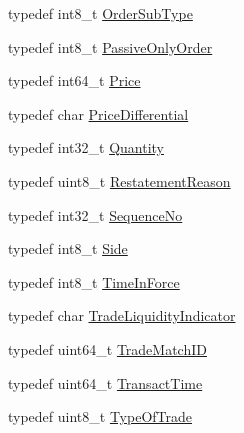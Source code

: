 \begin{DoxyCompactItemize}
\item 
typedef int8\+\_\+t \hyperlink{namespaceMetal_1_1LSE_afd57250a16de7395f5ad2bc63c7b8e5e}{Order\+Sub\+Type}
\item 
typedef int8\+\_\+t \hyperlink{namespaceMetal_1_1LSE_afb7bdec752b9048b6d725e2421586a64}{Passive\+Only\+Order}
\item 
typedef int64\+\_\+t \hyperlink{namespaceMetal_1_1LSE_a4a629b5e2aed21d653db0debf8b63af4}{Price}
\item 
typedef char \hyperlink{namespaceMetal_1_1LSE_a43d1d8f30663383025e28ce3ca39a19c}{Price\+Differential}
\item 
typedef int32\+\_\+t \hyperlink{namespaceMetal_1_1LSE_a86342859fb8034a9649f6d789e97d9da}{Quantity}
\item 
typedef uint8\+\_\+t \hyperlink{namespaceMetal_1_1LSE_a16935327b8c86efab5ac513a640e8e85}{Restatement\+Reason}
\item 
typedef int32\+\_\+t \hyperlink{namespaceMetal_1_1LSE_ab495640332963bbcc53c0c8b3aa48326}{Sequence\+No}
\item 
typedef int8\+\_\+t \hyperlink{namespaceMetal_1_1LSE_af5236b7a999484d8cd5b579b7d7c133b}{Side}
\item 
typedef int8\+\_\+t \hyperlink{namespaceMetal_1_1LSE_a59a4a742606e572af3f14a34a7503ee9}{Time\+In\+Force}
\item 
typedef char \hyperlink{namespaceMetal_1_1LSE_a2230716d38d6562a96dd1b7a53f04c8a}{Trade\+Liquidity\+Indicator}
\item 
typedef uint64\+\_\+t \hyperlink{namespaceMetal_1_1LSE_a9026616462e8f8b2d1b41935d63b1f77}{Trade\+Match\+I\+D}
\item 
typedef uint64\+\_\+t \hyperlink{namespaceMetal_1_1LSE_a4f27043d4f3897c99c960b89b5fe8ddb}{Transact\+Time}
\item 
typedef uint8\+\_\+t \hyperlink{namespaceMetal_1_1LSE_ae826e079e4b4ee205481709e1436a672}{Type\+Of\+Trade}
\end{DoxyCompactItemize}
